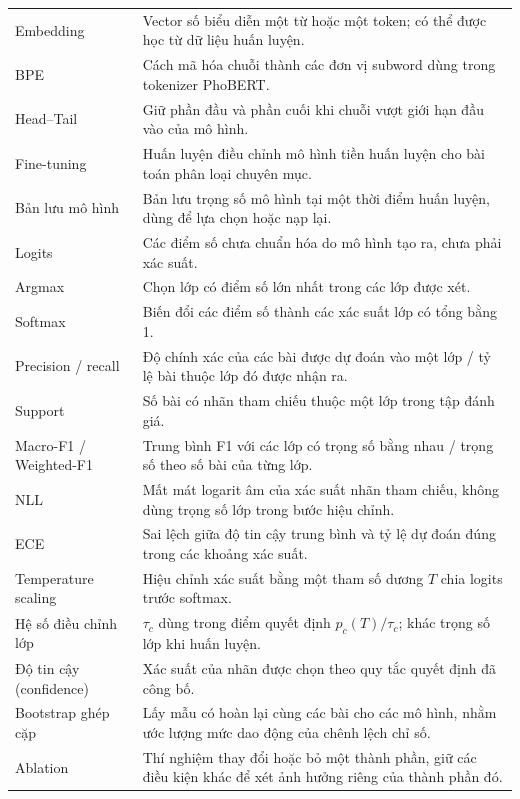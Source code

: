 \begin{longtable}{p{35mm}p{115mm}}
Embedding & Vector số biểu diễn một từ hoặc một token; có thể được học từ dữ liệu huấn luyện.\\
BPE & Cách mã hóa chuỗi thành các đơn vị subword dùng trong tokenizer PhoBERT.\\
Head--Tail & Giữ phần đầu và phần cuối khi chuỗi vượt giới hạn đầu vào của mô hình.\\
Fine-tuning & Huấn luyện điều chỉnh mô hình tiền huấn luyện cho bài toán phân loại chuyên mục.\\
Bản lưu mô hình & Bản lưu trọng số mô hình tại một thời điểm huấn luyện, dùng để lựa chọn hoặc nạp lại.\\
Logits & Các điểm số chưa chuẩn hóa do mô hình tạo ra, chưa phải xác suất.\\
Argmax & Chọn lớp có điểm số lớn nhất trong các lớp được xét.\\
Softmax & Biến đổi các điểm số thành các xác suất lớp có tổng bằng 1.\\
Precision / recall & Độ chính xác của các bài được dự đoán vào một lớp / tỷ lệ bài thuộc lớp đó được nhận ra.\\
Support & Số bài có nhãn tham chiếu thuộc một lớp trong tập đánh giá.\\
Macro-F1 / Weighted-F1 & Trung bình F1 với các lớp có trọng số bằng nhau / trọng số theo số bài của từng lớp.\\
NLL & Mất mát logarit âm của xác suất nhãn tham chiếu, không dùng trọng số lớp trong bước hiệu chỉnh.\\
ECE & Sai lệch giữa độ tin cậy trung bình và tỷ lệ dự đoán đúng trong các khoảng xác suất.\\
Temperature scaling & Hiệu chỉnh xác suất bằng một tham số dương $T$ chia logits trước softmax.\\
Hệ số điều chỉnh lớp & $\tau_c$ dùng trong điểm quyết định $p_c(T)/\tau_c$; khác trọng số lớp khi huấn luyện.\\
Độ tin cậy (confidence) & Xác suất của nhãn được chọn theo quy tắc quyết định đã công bố.\\
Bootstrap ghép cặp & Lấy mẫu có hoàn lại cùng các bài cho các mô hình, nhằm ước lượng mức dao động của chênh lệch chỉ số.\\
Ablation & Thí nghiệm thay đổi hoặc bỏ một thành phần, giữ các điều kiện khác để xét ảnh hưởng riêng của thành phần đó.\\
\end{longtable}
